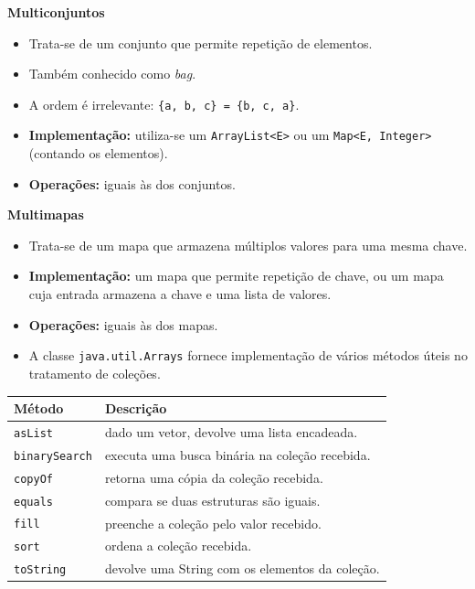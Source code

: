 \bigskip

\textbf{Multiconjuntos}
\begin{itemize}
	\item Trata-se de um conjunto que permite repetição de elementos.
	\item Também conhecido como \textit{bag}.
	\item A ordem é irrelevante: \texttt{\{a, b, c\} = \{b, c, a\}}.
	\item \textbf{Implementação:} utiliza-se um \texttt{ArrayList<E>} ou um \texttt{Map<E, Integer>} (contando os elementos).
	\item \textbf{Operações:} iguais às dos conjuntos.
\end{itemize}

\bigskip

\textbf{Multimapas}
\begin{itemize}
	\item Trata-se de um mapa que armazena múltiplos valores para uma mesma chave.
	\item \textbf{Implementação:} um mapa que permite repetição de chave, ou um mapa cuja entrada armazena a chave e uma lista de valores.
	\item \textbf{Operações:} iguais às dos mapas.
\end{itemize}

\clearpage


\begin{itemize}
	\item A classe \texttt{java.util.Arrays} fornece implementação de vários métodos úteis no tratamento de coleções.
\end{itemize}

\begin{table}[H]
	\centering
	\begin{tabular}{ll}
		\hline
		\textbf{Método} & \textbf{Descrição} \\
		\hline
		\texttt{asList} & dado um vetor, devolve uma lista encadeada. \\
		\texttt{binarySearch} & executa uma busca binária na coleção recebida. \\
		\texttt{copyOf} & retorna uma cópia da coleção recebida. \\
		\texttt{equals} & compara se duas estruturas são iguais. \\
		\texttt{fill} & preenche a coleção pelo valor recebido. \\
		\texttt{sort} & ordena a coleção recebida. \\
		\texttt{toString} & devolve uma String com os elementos da coleção. \\
		\hline
	\end{tabular}
\end{table}

